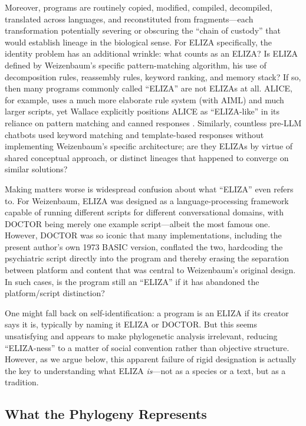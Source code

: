 \documentclass{article}
\begin{document}
Moreover, programs are routinely copied, modified, compiled, decompiled, translated across languages, and reconstituted from fragments—each transformation potentially severing or obscuring the ``chain of custody'' that would establish lineage in the biological sense. For ELIZA specifically, the identity problem has an additional wrinkle: what counts as an ELIZA? Is ELIZA defined by Weizenbaum's specific pattern-matching algorithm, his use of decomposition rules, reassembly rules, keyword ranking, and memory stack? If so, then many programs commonly called ``ELIZA'' are not ELIZAs at all. ALICE, for example, uses a much more elaborate rule system (with AIML) and much larger scripts, yet Wallace explicitly positions ALICE as ``ELIZA-like'' in its reliance on pattern matching and canned responses \cite{wallace2009alice}. Similarly, countless pre-LLM chatbots used keyword matching and template-based responses without implementing Weizenbaum's specific architecture; are they ELIZAs by virtue of shared conceptual approach, or distinct lineages that happened to converge on similar solutions?

Making matters worse is widespread confusion about what ``ELIZA'' even refers to. For Weizenbaum, ELIZA was designed as a language-processing framework capable of running different scripts for different conversational domains, with DOCTOR being merely one example script—albeit the most famous one. However, DOCTOR was so iconic that many implementations, including the present author's own 1973 BASIC version, conflated the two, hardcoding the psychiatric script directly into the program and thereby erasing the separation between platform and content that was central to Weizenbaum's original design. In such cases, is the program still an ``ELIZA'' if it has abandoned the platform/script distinction?

One might fall back on self-identification: a program is an ELIZA if its creator says it is, typically by naming it ELIZA or DOCTOR. But this seems unsatisfying and appears to make phylogenetic analysis irrelevant, reducing ``ELIZA-ness'' to a matter of social convention rather than objective structure. However, as we argue below, this apparent failure of rigid designation is actually the key to understanding what ELIZA \emph{is}—not as a species or a text, but as a tradition.

\subsection{What the Phylogeny Represents}
\end{document}
